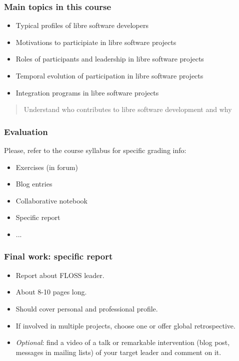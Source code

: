 \begin{frame}
\frametitle{Main topics in this course}

\begin{itemize}
\item Typical profiles of libre software developers
\item Motivations to participiate in libre software projects
\item Roles of participants and leadership in libre software projects
\item Temporal evolution of participation in libre software projects
\item Integration programs in libre software projects
\end{itemize}

\begin{quote}
\begin{center}
Understand who contributes to libre software development and why
\end{center}
\end{quote}

\end{frame}


\begin{frame}
\frametitle{Evaluation}

Please, refer to the course syllabus for specific grading info:
\begin{itemize}
\item Exercises (in forum)
\item Blog entries
\item Collaborative notebook
\item Specific report
\item ...
\end{itemize}

\end{frame}


\begin{frame}
\frametitle{Final work: specific report}

\begin{itemize}
\item Report about FLOSS leader.
\item About 8-10 pages long.
\item Should cover personal and professional profile.
\item If involved in multiple projects, choose one or offer global retrospective.
\item \textit{Optional}: find a video of a talk or remarkable intervention (blog post, messages in mailing lists) of your target leader 
and comment on it.
\end{itemize}

\end{frame}

